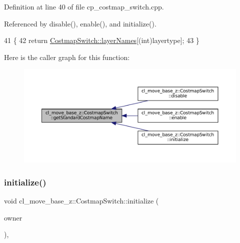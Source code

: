 Definition at line 40 of file cp\+\_\+costmap\+\_\+switch.\+cpp.



Referenced by disable(), enable(), and initialize().


\begin{DoxyCode}
41 \{
42     \textcolor{keywordflow}{return} \hyperlink{classcl__move__base__z_1_1CostmapSwitch_aee0c75c8f4459cacaf583ef8c90ff329}{CostmapSwitch::layerNames}[(int)layertype];
43 \}
\end{DoxyCode}
Here is the caller graph for this function\+:
\nopagebreak
\begin{figure}[H]
\begin{center}
\leavevmode
\includegraphics[width=350pt]{classcl__move__base__z_1_1CostmapSwitch_ac46796874242fdaa7efef86b66a55102_icgraph}
\end{center}
\end{figure}
\mbox{\label{classcl__move__base__z_1_1CostmapSwitch_af629ac6f390f90c0b6ad1008fa6b2586}} 
\subsubsection{\texorpdfstring{initialize()}{initialize()}}
{\footnotesize\ttfamily void cl\+\_\+move\+\_\+base\+\_\+z\+::\+Costmap\+Switch\+::initialize (\begin{DoxyParamCaption}\item[{\hyperlink{classsmacc_1_1ISmaccClient}{smacc\+::\+I\+Smacc\+Client} $\ast$}]{owner }\end{DoxyParamCaption})\hspace{0.3cm}{\ttfamily [override]}, {\ttfamily [virtual]}}



